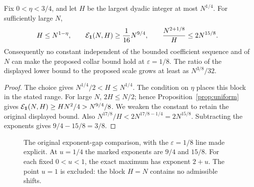 \begin{corollary}
\label{cor:v1-power-gap}
Fix \(0<\eta<3/4\), and let \(H\) be the largest dyadic integer
at most \(N^{1/4}\). For sufficiently large \(N\),
\[
 H\le N^{1-\eta},\qquad
 \mathcal E_{\mathbf1}(N,H)\ge\frac1{16}N^{9/4},\qquad
 \frac{N^{2+1/8}}H\le2N^{15/8}.
\]
Consequently no constant independent of the bounded coefficient
sequence and of \(N\) can make the proposed collar bound hold
at \(\varepsilon=1/8\). The ratio of the displayed lower bound
to the proposed scale grows at least as \(N^{3/8}/32\).
\end{corollary}
\begin{proof}
The choice gives \(N^{1/4}/2<H\le N^{1/4}\). The condition on
\(\eta\) places this block in the stated range. For large \(N\),
\(2H\le N/2\); hence Proposition~\ref{prop:uniform} gives
\(\mathcal E_{\mathbf1}(N,H)\ge HN^2/4>N^{9/4}/8\).
We weaken the constant to retain the original displayed bound.
Also \(N^{17/8}/H<2N^{17/8-1/4}=2N^{15/8}\).
Subtracting the exponents gives \(9/4-15/8=3/8\).
\end{proof}

\begin{figure}[ht]
\centering
{}
\caption{The original exponent-gap comparison, with the
\(\varepsilon=1/8\) line made explicit. At \(u=1/4\) the marked
exponents are \(9/4\) and \(15/8\). For each fixed \(0<u<1\),
the exact maximum has exponent \(2+u\). The point \(u=1\) is
excluded: the block \(H=N\) contains no admissible shifts.}
\label{fig:v1-gap}
\end{figure}

